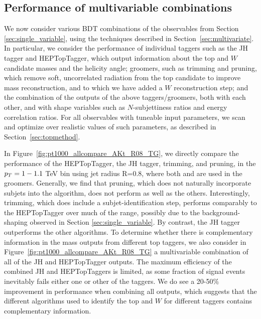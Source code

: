 \subsection{Performance of multivariable combinations}
We now consider various BDT combinations of the observables from Section \ref{sec:single_variable}, using the techniques described in Section~\ref{sec:multivariate}. In particular, we consider the performance of individual taggers such as the JH tagger and HEPTopTagger, which output information about the top  and $W$ candidate masses and the helicity angle; groomers, such as trimming and pruning, which remove soft, uncorrelated radiation from the top candidate to improve mass reconstruction, and to which we have added a $W$ reconstruction step; and the combination of the outputs of the above taggers/groomers, both with each other, and with shape variables such as $N$-subjettiness ratios and energy correlation ratios. For all observables with tuneable input parameters, we scan and optimize over realistic values of such parameters, as described in Section~\ref{sec:topmethod}.



In Figure~\ref{fig:pt1000_allcompare_AKt_R08_TG}, we directly compare the performance of the HEPTopTagger, the JH tagger, trimming, and pruning, in the $p_T = 1-1.1$ TeV bin using jet radius R=0.8, where both \topmass and \wmass are used in the groomers. Generally, we find that pruning, which does not naturally incorporate subjets into the algorithm, does not perform as well as the others. Interestingly, trimming, which does include a subjet-identification step, performs comparably to the HEPTopTagger over much of the range, possibly due to the background-shaping observed in Section \ref{sec:single_variable}. By contrast, the JH tagger outperforms the other algorithms. To determine whether there is complementary information in the mass outputs from different top taggers, we also consider in Figure~\ref{fig:pt1000_allcompare_AKt_R08_TG} a multivariable combination of all of the JH and HEPTopTagger outputs. The maximum efficiency of the combined JH and HEPTopTaggers is limited, as some fraction of signal events inevitably fails either one or other of the taggers. We do see a 20-50\% improvement in performance when combining all outputs, which suggests that the different algorithms used to identify the top and $W$ for different taggers contains complementary information.

